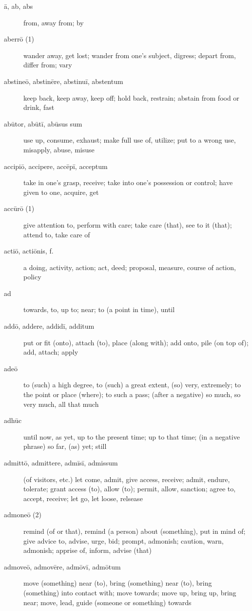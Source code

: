 \begin{description}
    \item[ā, ab, abs] \marginnote{*}from, away from; by
    \item[aberrō (1)] wander away, get lost; wander from one's subject, digress; depart from, differ from; vary
    \item[abstineō, abstinēre, abstinuī, abstentum] keep back, keep away, keep off; hold back, restrain; abstain from food or drink, fast
    \item[abūtor, abūtī, abūsus sum]  use up, consume, exhaust; make full use of, utilize; put to a wrong use, misapply, abuse, misuse
    \item[accipiō, accipere, accēpī, acceptum] \marginnote{*}take in one's grasp, receive; take into one's possession or control; have given to one, acquire, get
    \item[accūrō (1)] give attention to, perform with care; take care (that), see to it (that); attend to, take care of
    \item[actiō, actiōnis, f.] a doing, activity, action; act, deed; proposal, measure, course of action, policy
    \item[ad] \marginnote{*}towards, to, up to; near; to (a point in time), until
    \item[addō, addere, addidī, additum] \marginnote{*}put or fit (onto), attach (to), place (along with); add onto, pile (on top of); add, attach; apply
    \item[adeō] \marginnote{*}to (such) a high degree, to (such) a great extent, (so) very, extremely; to the point or place (where); to such a pass; (after a negative) so much, so very much, all that much
    \item[adhūc] \marginnote{*}until now, as yet, up to the present time; up to that time; (in a negative phrase) so far, (as) yet; still
    \item[admittō, admittere, admīsī, admissum] (of visitors, etc.) let come, admit, give access, receive; admit, endure, tolerate; grant access (to), allow (to); permit, allow, sanction; agree to, accept, receive; let go, let loose, relsease
    \item[admoneō (2)] remind (of or that), remind (a person) about (something), put in mind of; give advice to, advise, urge, bid; prompt, admonish; caution, warn, admonish; apprise of, inform, advise (that)
    \item[admoveō, admovēre, admōvī, admōtum]  move (something) near (to), bring (something) near (to), bring (something) into contact with; move towards; move up, bring up, bring near; move, lead, guide (someone or something) towards

\end{description}
